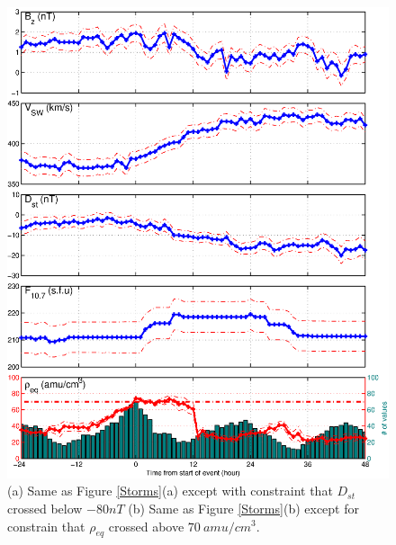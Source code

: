 \documentclass[10pt,twocolumn]{article}
\begin{document}
\begin{figure}[htp!]
\includegraphics[scale=0.45]{paperfigures/stormavs-m70.eps}
\caption{(a) Same as Figure \ref{Storms}(a) except with constraint that $D_{st}$ crossed below $-80nT$ (b) Same as Figure \ref{Storms}(b) except for constrain that $\rho_{eq}$ crossed above $70~amu/cm^3$.}
\label{Dspec}
\end{figure}
\clearpage
\end{document}
